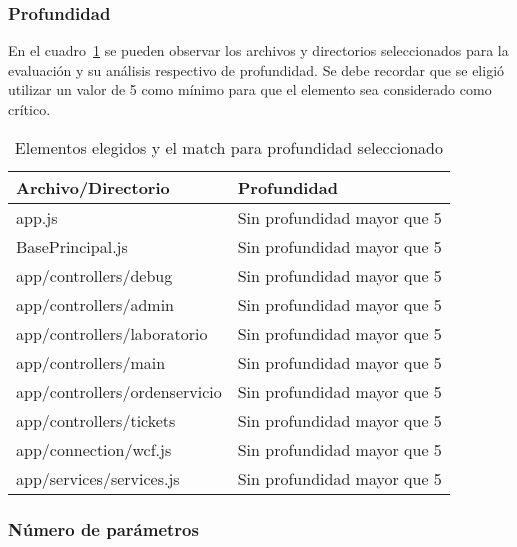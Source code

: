 \subsubsection{Profundidad}
En el cuadro~\ref{table:depth} se pueden observar los archivos y directorios
seleccionados para la evaluación y su análisis respectivo de profundidad. Se
debe recordar que se eligió utilizar un valor de 5 como mínimo para que el
elemento sea considerado como crítico.
\begin{table}
  \small
\centering
    \begin{tabular}{|l|l|}
    \hline
    \textbf{Archivo/Directorio}            & \textbf{Profundidad}                 \\ \hline
    app.js                        & Sin profundidad mayor que 5 \\ \hline
    BasePrincipal.js              & Sin profundidad mayor que 5 \\ \hline
    app/controllers/debug         & Sin profundidad mayor que 5 \\ \hline
    app/controllers/admin         & Sin profundidad mayor que 5 \\ \hline
    app/controllers/laboratorio   & Sin profundidad mayor que 5 \\ \hline
    app/controllers/main          & Sin profundidad mayor que 5 \\ \hline
    app/controllers/ordenservicio & Sin profundidad mayor que 5 \\ \hline
    app/controllers/tickets       & Sin profundidad mayor que 5 \\ \hline
    app/connection/wcf.js         & Sin profundidad mayor que 5 \\ \hline
    app/services/services.js      & Sin profundidad mayor que 5 \\ \hline
    \end{tabular}
    \caption{Elementos elegidos y el match para profundidad seleccionado}
    \label{table:depth}
\end{table}
\subsubsection{Número de parámetros}

